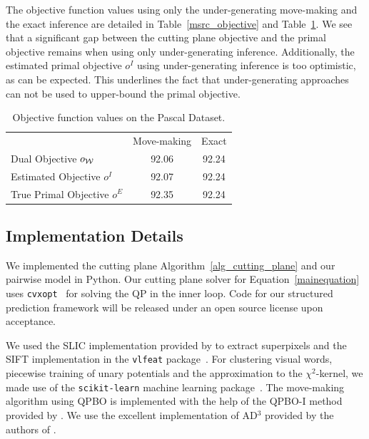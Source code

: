 The objective function values using only the under-generating move-making and
the exact inference are detailed in Table~\ref{msrc_objective} and Table~\ref{pascal_objective}.
We see that a significant gap between the cutting plane objective and the primal objective
remains when using only under-generating inference.
Additionally, the estimated primal objective $o^I$ using under-generating inference is
too optimistic, as can be expected. This underlines the fact that
under-generating approaches can not be used to upper-bound the primal
objective.

\begin{table}
    \begin{center}
    \begin{tabular}{lcc}
    \toprule
                    & Move-making & Exact \\
    \cmidrule{1-3}
    Dual Objective $o_{\mathcal{W}}$ &92.06& 92.24\\
    Estimated Objective $o^I$ & 92.07 &92.24\\
    True Primal Objective $o^E$&92.35& 92.24  \\
    \bottomrule
    \end{tabular}
    \end{center}
    \caption{Objective function values on the Pascal Dataset.}
    \label{pascal_objective}
\end{table}


\subsection{Implementation Details}
We implemented the cutting plane Algorithm~\ref{alg_cutting_plane} and our pairwise
model in Python.
Our cutting plane solver for Equation~\eqref{mainequation} uses
\texttt{cvxopt}~\citep{dahl2006cvxopt} for solving the QP in the inner loop. Code for
our structured prediction framework will be released under an open source
license upon acceptance.

We used the SLIC implementation provided by \citet{achanta2012slic} to extract superpixels and
the SIFT implementation in the \texttt{vlfeat} package~\citep{vedaldi08vlfeat}.
For clustering visual words, piecewise training of unary potentials and the
approximation to the $\chi^2$-kernel, we made use of the \texttt{scikit-learn}
machine learning package~\citep{pedregosa2011scikit}.
The move-making algorithm using QPBO is implemented with the help of the QPBO-I
method provided by \citet{rother2007optimizing}.
We use the excellent implementation of AD$^3$ provided by the authors of
\citet{martins2011augmented}. 

